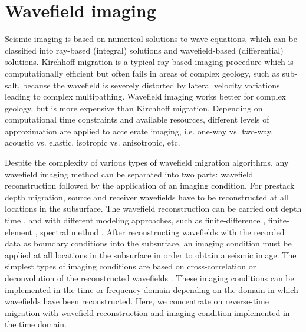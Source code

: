 \section{Wavefield imaging}

Seismic imaging is based on numerical solutions to wave equations,
which can be classified into ray-based (integral) solutions and
wavefield-based (differential) solutions. Kirchhoff migration is a
typical ray-based imaging procedure which is computationally efficient
but often fails in areas of complex geology, such as sub-salt, because
the wavefield is severely distorted by lateral velocity variations
leading to complex multipathing. Wavefield imaging works better for
complex geology, but is more expensive than Kirchhoff
migration. Depending on computational time constraints and available
resources, different levels of approximation are applied to accelerate
imaging, i.e. one-way vs. two-way, acoustic vs. elastic, isotropic
vs. anisotropic, etc.

Despite the complexity of various types of wavefield migration
algorithms, any wavefield imaging method can be separated into two
parts: wavefield reconstruction followed by the application of an
imaging condition.  For prestack depth migration, source and receiver
wavefields have to be reconstructed at all locations in the
subsurface.  The wavefield reconstruction can be carried out
  depth
  time , and with different
modeling approaches, such as finite-difference
\cite[]{GEO51-01-00540066,alford:834}, finite-element
\cite[]{GEO41-01-01450151},  spectral method
\cite[]{seriani:1561,seriani:1285,dai:427} . After
reconstructing wavefields with the recorded data as boundary
conditions into the subsurface, an imaging condition must be applied
at all locations in the subsurface in order to obtain a seismic
image. The simplest types of imaging conditions are based on
cross-correlation or deconvolution of the reconstructed wavefields
\cite[]{GEO36-03-04670481}. These imaging conditions can be
implemented in the time or frequency domain depending on the domain
in which wavefields have been reconstructed. Here, we concentrate on
reverse-time migration with wavefield reconstruction and imaging
condition implemented in the time domain.

